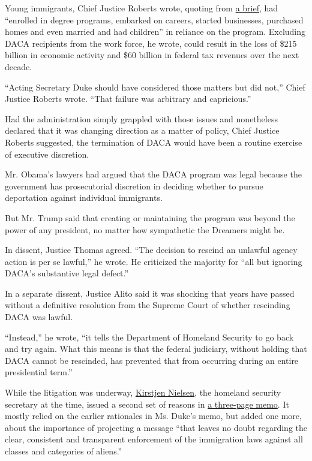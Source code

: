 Young immigrants, Chief Justice Roberts wrote, quoting from
\href{https://www.supremecourt.gov/DocketPDF/18/18-587/117328/20190927151220415_18-587\%20Regents\%20Brief\%20for\%20Respondents.pdf}{a
brief}, had ``enrolled in degree programs, embarked on careers, started
businesses, purchased homes and even married and had children'' in
reliance on the program. Excluding DACA recipients from the work force,
he wrote, could result in the loss of \$215 billion in economic activity
and \$60 billion in federal tax revenues over the next decade.

``Acting Secretary Duke should have considered those matters but did
not,'' Chief Justice Roberts wrote. ``That failure was arbitrary and
capricious.''

Had the administration simply grappled with those issues and nonetheless
declared that it was changing direction as a matter of policy, Chief
Justice Roberts suggested, the termination of DACA would have been a
routine exercise of executive discretion.

Mr. Obama's lawyers had argued that the DACA program was legal because
the government has prosecutorial discretion in deciding whether to
pursue deportation against individual immigrants.

But Mr. Trump said that creating or maintaining the program was beyond
the power of any president, no matter how sympathetic the Dreamers might
be.

In dissent, Justice Thomas agreed. ``The decision to rescind an unlawful
agency action is per se lawful,'' he wrote. He criticized the majority
for ``all but ignoring DACA's substantive legal defect.''

In a separate dissent, Justice Alito said it was shocking that years
have passed without a definitive resolution from the Supreme Court of
whether rescinding DACA was lawful.

``Instead,'' he wrote, ``it tells the Department of Homeland Security to
go back and try again. What this means is that the federal judiciary,
without holding that DACA cannot be rescinded, has prevented that from
occurring during an entire presidential term.''

While the litigation was underway,
\href{https://www.nytimes3xbfgragh.onion/2019/04/07/us/politics/kirstjen-nielsen-dhs-resigns.html}{Kirstjen
Nielsen}, the homeland security secretary at the time, issued a second
set of reasons in
\href{https://www.dhs.gov/sites/default/files/publications/18_0622_S1_Memorandum_DACA.pdf}{a
three-page memo}. It mostly relied on the earlier rationales in Ms.
Duke's memo, but added one more, about the importance of projecting a
message ``that leaves no doubt regarding the clear, consistent and
transparent enforcement of the immigration laws against all classes and
categories of aliens.''

